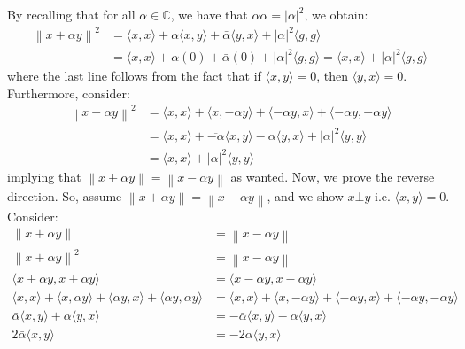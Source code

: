 \documentclass{article}
\newcommand{\norm}[1]{\left\lVert#1\right\rVert}
\begin{document}
\begin{enumerate}
            By recalling that for all $\alpha\in\mathbb{C}$, we have that $\alpha\bar{\alpha} = |\alpha|^2$, we obtain:
            \begin{align*}
                \norm{x+\alpha y}^2 &= \langle x,x\rangle + \alpha\langle x,y\rangle + \bar{\alpha}\langle y,x\rangle +
                |\alpha|^2\langle g,g\rangle \\
                &= \langle x,x\rangle + \alpha(0) + \bar{\alpha}(0) + |\alpha|^2\langle g,g\rangle = \langle x,x\rangle 
                    + |\alpha|^2\langle g,g\rangle
            \end{align*}
            where the last line follows from the fact that if $\langle x,y\rangle = 0$, then $\langle y,x\rangle = 0$.
            Furthermore, consider:
            \begin{align*}
                \norm{x-\alpha y}^2 &= \langle x,x\rangle + \langle x,-\alpha y\rangle + \langle -\alpha y, x\rangle +
                    \langle -\alpha y,-\alpha y\rangle \\
                &= \langle x,x\rangle + \overline{-\alpha}\langle x,y\rangle - \alpha\langle y,x\rangle + |\alpha|^2\langle y,y\rangle \\
                &= \langle x,x\rangle + |\alpha|^2\langle y,y\rangle 
            \end{align*}
            implying that $\norm{x+\alpha y} = \norm{x-\alpha y}$ as wanted. Now, we prove the reverse direction. So, assume
            $\norm{x+\alpha y} = \norm{x - \alpha y}$, and we show $x\bot y$ i.e. $\langle x,y\rangle = 0$. Consider:
            \begin{align*}
                \norm{x+\alpha y} &= \norm{x-\alpha y} \\
                \norm{x+\alpha y}^2 &= \norm{x-\alpha y} \\
                \langle x+\alpha y,x+\alpha y\rangle &= \langle x-\alpha y,x-\alpha y\rangle \\
                \langle x,x\rangle + \langle x,\alpha y\rangle + \langle \alpha y,x\rangle + \langle \alpha y,\alpha y\rangle &= 
                    \langle x,x\rangle + \langle x,-\alpha y\rangle + \langle -\alpha y,x\rangle + \langle -\alpha y,-\alpha y\rangle \\
                \bar{\alpha}\langle x,y\rangle + \alpha\langle y,x\rangle &= -\bar{\alpha}\langle x,y\rangle - \alpha\langle y,x\rangle\\
                2\bar{\alpha}\langle x,y\rangle &= -2\alpha\langle y,x\rangle \\

\end{align*}
\end{enumerate}
\end{document}
